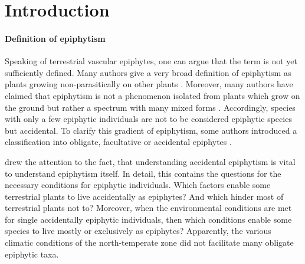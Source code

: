 \documentclass[12pt, a4paper, oneside, draft]{scrartcl}
\begin{document}
 \doublespacing





\newpage


\section{Introduction}

	\paragraph{Definition of epiphytism}
	Speaking of terrestrial vascular epiphytes, one can argue that the term is not yet sufficiently defined. Many authors give a very broad definition of epiphytism as plants growing non-parasitically on other plants \parencite[e.g.][]{Zotz2016, Burns2010, Benzing2012, Brown1948, Schimper1903}. Moreover, many authors have claimed that epiphytism is not a phenomenon isolated from plants which grow on the ground but rather a spectrum with many mixed forms \parencite[e.g.][]{Zotz2016}. Accordingly, species with only a few epiphytic individuals are not to be considered epiphytic species but accidental. To clarify this gradient of epiphytism, some authors introduced a classification into obligate, facultative or accidental epiphytes \parencite{Ibisch1996, Benzing2004}. 
	
	\textcite{Zotz2003} drew the attention to the fact, that understanding accidental epiphytism is vital to understand epiphytism itself. In detail, this contains the questions for the necessary conditions for epiphytic individuals. Which factors enable some terrestrial plants to live accidentally as epiphytes? And which hinder most of terrestrial plants not to? Moreover, when the environmental conditions are met for single accidentally epiphytic individuals, then which conditions enable some species to live mostly or exclusively as epiphytes? Apparently, the various climatic conditions of the north-temperate zone did not facilitate many obligate epiphytic taxa.
	
\end{document}
